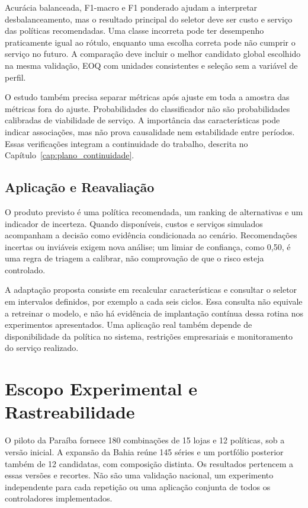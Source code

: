 Acurácia balanceada, F1-macro e F1 ponderado ajudam a interpretar desbalanceamento, mas o resultado principal do seletor deve ser custo e serviço das políticas recomendadas. Uma classe incorreta pode ter desempenho praticamente igual ao rótulo, enquanto uma escolha correta pode não cumprir o serviço no futuro. A comparação deve incluir o melhor candidato global escolhido na mesma validação, EOQ com unidades consistentes e seleção sem a variável de perfil.

O estudo também precisa separar métricas após ajuste em toda a amostra das métricas fora do ajuste. Probabilidades do classificador não são probabilidades calibradas de viabilidade de serviço. A importância das características pode indicar associações, mas não prova causalidade nem estabilidade entre períodos. Essas verificações integram a continuidade do trabalho, descrita no Capítulo~\ref{cap:plano_continuidade}.

\subsection{Aplicação e Reavaliação}
\label{sec:aplicacao_aipe}

O produto previsto é uma política recomendada, um ranking de alternativas e um indicador de incerteza. Quando disponíveis, custos e serviços simulados acompanham a decisão como evidência condicionada ao cenário. Recomendações incertas ou inviáveis exigem nova análise; um limiar de confiança, como 0,50, é uma regra de triagem a calibrar, não comprovação de que o risco esteja controlado.

A adaptação proposta consiste em recalcular características e consultar o seletor em intervalos definidos, por exemplo a cada seis ciclos. Essa consulta não equivale a retreinar o modelo, e não há evidência de implantação contínua dessa rotina nos experimentos apresentados. Uma aplicação real também depende de disponibilidade da política no sistema, restrições empresariais e monitoramento do serviço realizado.

\section{Escopo Experimental e Rastreabilidade}
\label{sec:protocolo_exp}
\label{sec:reporting}

O piloto da Paraíba fornece 180 combinações de 15 lojas e 12 políticas, sob a versão inicial. A expansão da Bahia reúne 145 séries e um portfólio posterior também de 12 candidatas, com composição distinta. Os resultados pertencem a essas versões e recortes. Não são uma validação nacional, um experimento independente para cada repetição ou uma aplicação conjunta de todos os controladores implementados.

